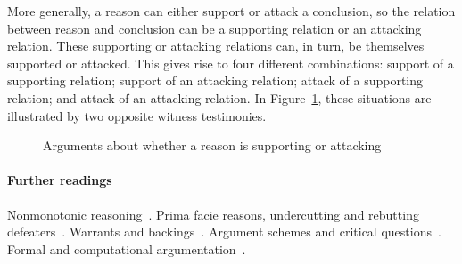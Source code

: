 \documentclass[10pt]{article}
\begin{document}
More generally,  a reason can either support or attack a conclusion, so the relation between reason and conclusion can be a supporting relation 
or an attacking relation. These supporting or attacking relations can, in turn, be themselves supported or attacked. This gives rise to four different combinations: support of a supporting relation; support of an attacking relation; attack of a supporting relation; and attack of an attacking relation. In Figure~\ref{fig:nesting}, these situations are illustrated by two opposite witness testimonies. 


\begin{figure}[bt]
\centering

\caption{Arguments about whether a reason is supporting or attacking\label{fig:nesting}}
\end{figure}

\paragraph{Further readings} Nonmonotonic reasoning~\citep{gabbayEtal1994}. Prima facie reasons, undercutting and rebutting defeaters~\citep{pollock1987, pollock1995}. Warrants and backings~\citep{toulmin1958}. Argument schemes and critical questions~\citep{waltonReedMacagno2008}. Formal and computational argumentation~\citep{vanEemerenEtal2014ch11}.
\end{document}
